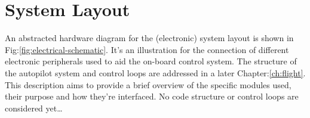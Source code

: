 \section{System Layout}
\label{sec:proto.layout}
{\centering
{}
}
\newpage
An abstracted hardware diagram for the (electronic) system layout is shown in Fig:\ref{fig:electrical-schematic}. It's an illustration for the connection of different electronic peripherals used to aid the on-board control system. The structure of the autopilot system and control loops are addressed in a later Chapter:\ref{ch:flight}. This description aims to provide a brief overview of the specific modules used, their purpose and how they're interfaced. No code structure or control loops are considered yet\ldots
